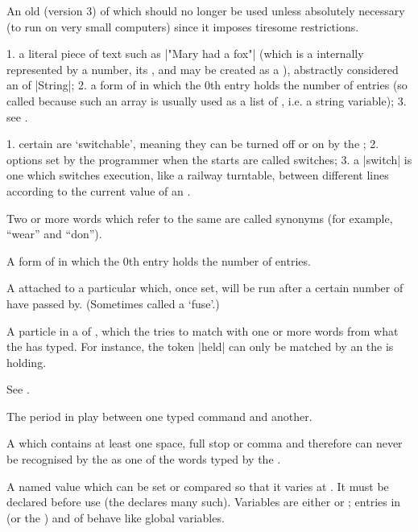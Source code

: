 %
An old  (version 3) of  which should no longer be
used unless absolutely necessary (to run on very small computers) since it
imposes tiresome restrictions.

%
1. a literal piece of text such as |"Mary had a fox"| (which is a
 internally represented by a number, its ,
and may be created as a ), abstractly considered an 
of  |String|; 2. a form of  in
which the 0th entry holds the number of entries (so called because such an
array is usually used as a list of , i.e. a string variable);
3. see .

%
1. certain  are `switchable', meaning they can be turned off or
on by the ; 2. options set by the programmer when the 
starts are called switches; 3. a |switch|  is one which
switches execution, like a railway turntable, between different lines
according to the current value of an .

%
Two or more words which refer to the same  are called synonyms (for
example, ``wear'' and ``don'').

%
A form of  in which the 0th entry holds the number of entries.

%
A  attached to a particular  which, once set, will be
run after a certain number of  have passed by.  (Sometimes called
a `fuse'.)

%
A particle in a  of , which the  tries
to match with one or more words from what the  has typed.  For
instance, the token |held| can only be matched by an  the
 is holding.

%
See .

%
The period in play between one typed command and another.

%
A  which contains at least one space, full stop or
comma and therefore can never be recognised by the  as one of the
words typed by the .

%
A named value which can be set or compared so that it varies at .
It must be declared before use (the  declares many such).
Variables are either  or ; entries in  (or the
) and  of  behave like global
variables.

